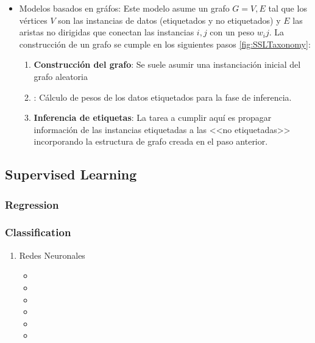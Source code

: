 \begin{itemize}
  \item Modelos basados en gráfos: Este modelo asume un grafo $G = {V,E}$ tal que los vértices $V$ son las instancias de datos (etiquetados y no etiquetados) y $E$ las aristas no dirigidas que conectan las instancias $i,j$ con un peso $w_ij$. La construcción de un grafo se cumple en los siguientes pasos  \ref{fig:SSLTaxonomy}:
        \begin{enumerate}
          \item \textbf{Construcción del grafo}: Se suele asumir una instanciación inicial del grafo aleatoria
          \item \textbf{}: Cálculo de pesos de los datos etiquetados para la fase de inferencia.
          \item \textbf{Inferencia de etiquetas}: La tarea a cumplir aquí es propagar información de las instancias etiquetadas a las <<no etiquetadas>> incorporando la estructura de grafo creada en el paso anterior.
        \end{enumerate}
\end{itemize}


\subsection{Supervised Learning}



\subsubsection{Regression}

\subsubsection{Classification}

\begin{enumerate}
  \item Redes Neuronales

        \begin{itemize}
          \item {}
          \item {}
          \item {}
          \item {}
          \item {}
          \item {}
        \end{itemize}

\end{enumerate}

